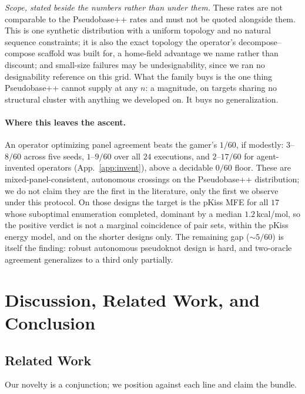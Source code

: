 \documentclass[11pt]{article}
\begin{document}
\emph{Scope, stated beside the numbers rather than under them.} These rates are not comparable to the
Pseudobase++ rates and must not be quoted alongside them. This is one synthetic distribution with a uniform
topology and no natural sequence constraints; it is also the exact topology the operator's decompose--compose
scaffold was built for, a home-field advantage we name rather than discount; and small-size failures may be
undesignability, since we ran no designability reference on this grid. What the family buys is the one thing
Pseudobase++ cannot supply at any $n$: a magnitude, on targets sharing no structural cluster with anything we
developed on. It buys no generalization.

\paragraph{Where this leaves the ascent.} An operator optimizing panel agreement beats the gamer's $1/60$, if
modestly: $3$--$8/60$ across five seeds, $1$--$9/60$ over all $24$ executions, and
$2$--$17/60$ for agent-invented operators (App.~\ref{app:invent}), above a decidable $0/60$ floor. These are
mixed-panel-consistent, autonomous crossings on the Pseudobase++ distribution; we do not claim they are the
first in the literature, only the first we observe under this protocol. On those designs the target is the
pKiss MFE for all $17$ whose suboptimal enumeration completed, dominant by a median $1.2$\,kcal/mol, so the
positive verdict is not a marginal coincidence of pair sets, within the pKiss energy model, and on the
shorter designs only. The remaining gap ($\sim\!5/60$) is itself the finding: robust autonomous pseudoknot
design is hard, and two-oracle agreement generalizes to a third only partially.

\section{Discussion, Related Work, and Conclusion}\label{sec:discussion}

\subsection{Related Work}\label{sec:related}
Our novelty is a conjunction; we position against each line and claim the bundle.
\end{document}
